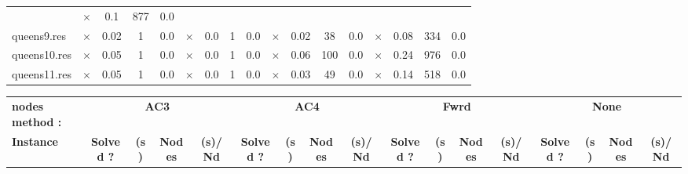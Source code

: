 \documentclass[main.tex]{subfiles}
\begin{document}
\begin{landscape}
\begin{center}
\begin{tabular}{lcccccccccccccccc}
 & $\times$ & 0.1 & 877 & 0.0
\\
queens9.res & $\times$ & 0.02 & 1 & 0.0
 & $\times$ & 0.0 & 1 & 0.0
 & $\times$ & 0.02 & 38 & 0.0
 & $\times$ & 0.08 & 334 & 0.0
\\
queens10.res & $\times$ & 0.05 & 1 & 0.0
 & $\times$ & 0.0 & 1 & 0.0
 & $\times$ & 0.06 & 100 & 0.0
 & $\times$ & 0.24 & 976 & 0.0
\\
queens11.res & $\times$ & 0.05 & 1 & 0.0
 & $\times$ & 0.0 & 1 & 0.0
 & $\times$ & 0.03 & 49 & 0.0
 & $\times$ & 0.14 & 518 & 0.0
\\
\hline\end{tabular}
\end{center}
\end{landscape}
\newpage
\begin{landscape}
\begin{center}
\renewcommand{\arraystretch}{1.4} 
\begin{tabular}{lcccccccccccccccc}
	\hline
\textbf{nodes method :} & \multicolumn{4}{c}{\textbf{AC3}} & \multicolumn{4}{c}{\textbf{AC4}} & \multicolumn{4}{c}{\textbf{Fwrd}} & \multicolumn{4}{c}{\textbf{None}}\\
\textbf{Instance}  & \textbf{Solved ?} & \textbf{(s)} & \textbf{Nodes} & \textbf{(s)/Nd} & \textbf{Solved ?} & \textbf{(s)} & \textbf{Nodes} & \textbf{(s)/Nd} & \textbf{Solved ?} & \textbf{(s)} & \textbf{Nodes} & \textbf{(s)/Nd} & \textbf{Solved ?} & \textbf{(s)} & \textbf{Nodes} & \textbf{(s)/Nd}\\\hline


\end{tabular}
\end{center}
\end{landscape}
\end{document}

